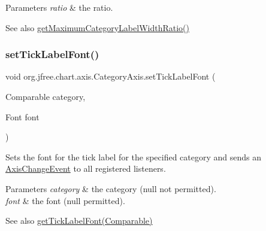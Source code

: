 \begin{DoxyParams}{Parameters}
{\em ratio} & the ratio.\\
\hline
\end{DoxyParams}
\begin{DoxySeeAlso}{See also}
\mbox{\hyperlink{classorg_1_1jfree_1_1chart_1_1axis_1_1_category_axis_a0c0286d9bf8c1fc7250d44b67969ab6a}{get\+Maximum\+Category\+Label\+Width\+Ratio()}} 
\end{DoxySeeAlso}
\mbox{\label{classorg_1_1jfree_1_1chart_1_1axis_1_1_category_axis_aa352e3ac25d24cf67ec08c85d1417005}} 
\subsubsection{\texorpdfstring{set\+Tick\+Label\+Font()}{setTickLabelFont()}}
{\footnotesize\ttfamily void org.\+jfree.\+chart.\+axis.\+Category\+Axis.\+set\+Tick\+Label\+Font (\begin{DoxyParamCaption}\item[{Comparable}]{category,  }\item[{Font}]{font }\end{DoxyParamCaption})}

Sets the font for the tick label for the specified category and sends an \mbox{\hyperlink{}{Axis\+Change\+Event}} to all registered listeners.


\begin{DoxyParams}{Parameters}
{\em category} & the category ({\ttfamily null} not permitted). \\
\hline
{\em font} & the font ({\ttfamily null} permitted).\\
\hline
\end{DoxyParams}
\begin{DoxySeeAlso}{See also}
\mbox{\hyperlink{classorg_1_1jfree_1_1chart_1_1axis_1_1_category_axis_a6b5dd23193a2c21cc442ca4bbfe6be48}{get\+Tick\+Label\+Font(\+Comparable)}} 
\end{DoxySeeAlso}
\mbox{\label{classorg_1_1jfree_1_1chart_1_1axis_1_1_category_axis_a95b4a4ce7cdc45ad523e4c496908c924}} 
